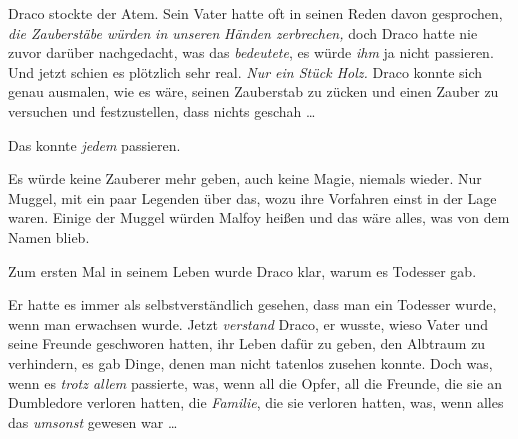 Draco stockte der Atem. Sein Vater hatte oft in seinen Reden davon gesprochen, \emph{die Zauberstäbe würden} \emph{in unseren} \emph{Händen zerbrechen,} doch Draco hatte nie zuvor darüber nachgedacht, was das \emph{bedeutete}, es würde \emph{ihm} ja nicht passieren. Und jetzt schien es plötzlich sehr real. \emph{Nur ein Stück Holz.} Draco konnte sich genau ausmalen, wie es wäre, seinen Zauberstab zu zücken und einen Zauber zu versuchen und festzustellen, dass nichts geschah …

Das konnte \emph{jedem} passieren.

Es würde keine Zauberer mehr geben, auch keine Magie, niemals wieder. Nur Muggel, mit ein paar Legenden über das, wozu ihre Vorfahren einst in der Lage waren. Einige der Muggel würden Malfoy heißen und das wäre alles, was von dem Namen blieb.

Zum ersten Mal in seinem Leben wurde Draco klar, warum es Todesser gab.

Er hatte es immer als selbstverständlich gesehen, dass man ein Todesser wurde, wenn man erwachsen wurde. Jetzt \emph{verstand} Draco, er wusste, wieso Vater und seine Freunde geschworen hatten, ihr Leben dafür zu geben, den Albtraum zu verhindern, es gab Dinge, denen man nicht tatenlos zusehen konnte. Doch was, wenn es \emph{trotz allem} passierte, was, wenn all die Opfer, all die Freunde, die sie an Dumbledore verloren hatten, die \emph{Familie}, die sie verloren hatten, was, wenn alles das \emph{umsonst} gewesen war …


